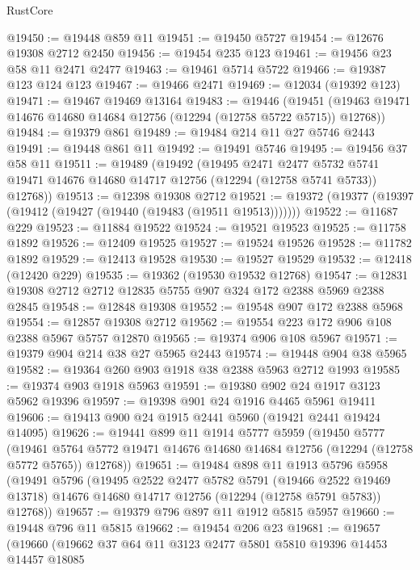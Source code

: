 \begin{lexlean}{RustCore}
\begin{coremodule}
@19450 := @19448 @859 @11
@19451 := @19450 @5727
@19454 := @12676 @19308 @2712 @2450
@19456 := @19454 @235 @123
@19461 := @19456 @23 @58 @11 @2471 @2477
@19463 := @19461 @5714 @5722
@19466 := @19387 @123 @124 @123
@19467 := @19466 @2471
@19469 := @12034 (@19392 @123)
@19471 := @19467 @19469 @13164
@19483 := @19446
    (@19451 (@19463 @19471 @14676 @14680 @14684 @12756 (@12294 (@12758 @5722 @5715)) @12768))
@19484 := @19379 @861
@19489 := @19484 @214 @11 @27 @5746 @2443
@19491 := @19448 @861 @11
@19492 := @19491 @5746
@19495 := @19456 @37 @58 @11
@19511 := @19489
    (@19492
      (@19495
        @2471
        @2477
        @5732
        @5741
        @19471
        @14676
        @14680
        @14717
        @12756
        (@12294 (@12758 @5741 @5733))
        @12768))
@19513 := @12398 @19308 @2712
@19521 := @19372 (@19377 (@19397 (@19412 (@19427 (@19440 (@19483 (@19511 @19513)))))))
@19522 := @11687 @229
@19523 := @11884 @19522
@19524 := @19521 @19523
@19525 := @11758 @1892
@19526 := @12409 @19525
@19527 := @19524 @19526
@19528 := @11782 @1892
@19529 := @12413 @19528
@19530 := @19527 @19529
@19532 := @12418 (@12420 @229)
@19535 := @19362 (@19530 @19532 @12768)
@19547 := @12831 @19308 @2712 @2712 @12835 @5755 @907 @324 @172 @2388 @5969 @2388 @2845
@19548 := @12848 @19308
@19552 := @19548 @907 @172 @2388 @5968
@19554 := @12857 @19308 @2712
@19562 := @19554 @223 @172 @906 @108 @2388 @5967 @5757 @12870
@19565 := @19374 @906 @108 @5967
@19571 := @19379 @904 @214 @38 @27 @5965 @2443
@19574 := @19448 @904 @38 @5965
@19582 := @19364 @260 @903 @1918 @38 @2388 @5963 @2712 @1993
@19585 := @19374 @903 @1918 @5963
@19591 := @19380 @902 @24 @1917 @3123 @5962 @19396
@19597 := @19398 @901 @24 @1916 @4465 @5961 @19411
@19606 := @19413 @900 @24 @1915 @2441 @5960 (@19421 @2441 @19424 @14095)
@19626 := @19441
    @899
    @11
    @1914
    @5777
    @5959
    (@19450
      @5777
      (@19461 @5764 @5772 @19471 @14676 @14680 @14684 @12756 (@12294 (@12758 @5772 @5765)) @12768))
@19651 := @19484
    @898
    @11
    @1913
    @5796
    @5958
    (@19491
      @5796
      (@19495
        @2522
        @2477
        @5782
        @5791
        (@19466 @2522 @19469 @13718)
        @14676
        @14680
        @14717
        @12756
        (@12294 (@12758 @5791 @5783))
        @12768))
@19657 := @19379 @796 @897 @11 @1912 @5815 @5957
@19660 := @19448 @796 @11 @5815
@19662 := @19454 @206 @23
@19681 := @19657
    (@19660
      (@19662
        @37
        @64
        @11
        @3123
        @2477
        @5801
        @5810
        @19396
        @14453
        @14457
        @18085

\end{coremodule}
\end{lexlean}
